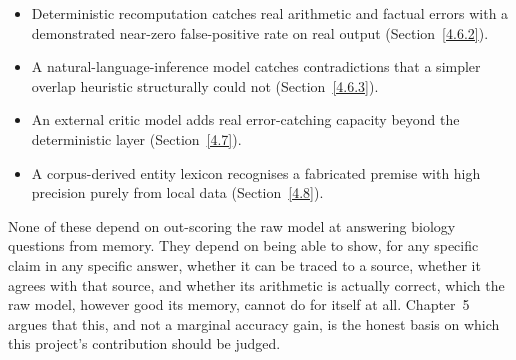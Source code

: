 \begin{itemize}
\item Deterministic recomputation catches real arithmetic and factual
errors with a demonstrated near-zero false-positive rate on real output
(Section~\ref{4.6.2}).
\item A natural-language-inference model catches contradictions that a
simpler overlap heuristic structurally could not (Section~\ref{4.6.3}).
\item An external critic model adds real error-catching capacity beyond
the deterministic layer (Section~\ref{4.7}).
\item A corpus-derived entity lexicon recognises a fabricated premise with
high precision purely from local data (Section~\ref{4.8}).
\end{itemize}

None of these depend on out-scoring the raw model at answering biology
questions from memory. They depend on being able to show, for any
specific claim in any specific answer, whether it can be traced to a
source, whether it agrees with that source, and whether its arithmetic is
actually correct, which the raw model, however good its memory, cannot do
for itself at all. Chapter~5 argues that this, and not a marginal accuracy
gain, is the honest basis on which this project's contribution should be
judged.
